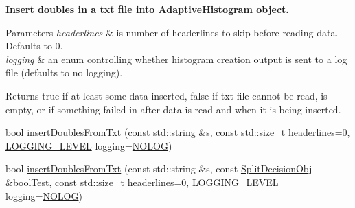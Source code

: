 \begin{Indent}{\bf \-Insert doubles in a txt file into \-Adaptive\-Histogram object.}
{\begin{DoxyParams}{\-Parameters}
{\em headerlines} & is number of headerlines to skip before reading data. \-Defaults to 0. \\
\hline
{\em logging} & an enum controlling whether histogram creation output is sent to a log file (defaults to no logging). \\
\hline
\end{DoxyParams}
\begin{DoxyReturn}{\-Returns}
true if at least some data inserted, false if txt file cannot be read, is empty, or if something failed in after data is read and when it is being inserted. 
\end{DoxyReturn}
}\begin{DoxyCompactItemize}
\item 
bool \hyperlink{classsubpavings_1_1AdaptiveHistogram_a3705758c35dbfe8745a2e34c83b7f619}{insert\-Doubles\-From\-Txt} (const std\-::string \&s, const std\-::size\-\_\-t headerlines=0, \hyperlink{namespacesubpavings_aef8e51096b59ecaf1a1e9b2ee24b6089}{\-L\-O\-G\-G\-I\-N\-G\-\_\-\-L\-E\-V\-E\-L} logging=\hyperlink{namespacesubpavings_aef8e51096b59ecaf1a1e9b2ee24b6089a1e5eba048e2496b2450d63fc2e9d1737}{\-N\-O\-L\-O\-G})
\item 
bool \hyperlink{classsubpavings_1_1AdaptiveHistogram_a3e03076ea91599538bcc69f47084f649}{insert\-Doubles\-From\-Txt} (const std\-::string \&s, const \hyperlink{classsubpavings_1_1SplitDecisionObj}{\-Split\-Decision\-Obj} \&bool\-Test, const std\-::size\-\_\-t headerlines=0, \hyperlink{namespacesubpavings_aef8e51096b59ecaf1a1e9b2ee24b6089}{\-L\-O\-G\-G\-I\-N\-G\-\_\-\-L\-E\-V\-E\-L} logging=\hyperlink{namespacesubpavings_aef8e51096b59ecaf1a1e9b2ee24b6089a1e5eba048e2496b2450d63fc2e9d1737}{\-N\-O\-L\-O\-G})
\end{DoxyCompactItemize}
\end{Indent}
